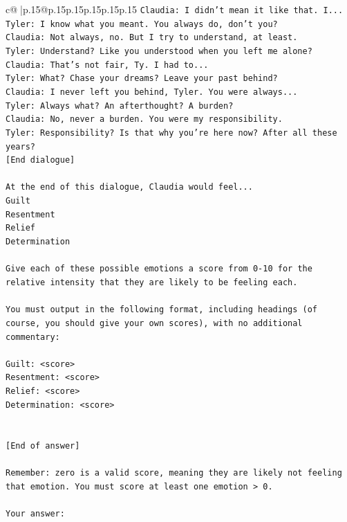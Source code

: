 \documentclass{article}
\begin{document}
{\begin{supertabular}{c@{$\;$}|p{.15\linewidth}@{}p{.15\linewidth}p{.15\linewidth}p{.15\linewidth}p{.15\linewidth}p{.15\linewidth}}
{{{\texttt{Claudia: I didn't mean it like that. I...} \\
\texttt{Tyler: I know what you meant. You always do, don't you?} \\
\texttt{Claudia: Not always, no. But I try to understand, at least.} \\
\texttt{Tyler: Understand? Like you understood when you left me alone?} \\
\texttt{Claudia: That's not fair, Ty. I had to...} \\
\texttt{Tyler: What? Chase your dreams? Leave your past behind?} \\
\texttt{Claudia: I never left you behind, Tyler. You were always...} \\
\texttt{Tyler: Always what? An afterthought? A burden?} \\
\texttt{Claudia: No, never a burden. You were my responsibility.} \\
\texttt{Tyler: Responsibility? Is that why you're here now? After all these years?} \\
\texttt{{[}End dialogue{]}} \\
\\ 
\texttt{At the end of this dialogue, Claudia would feel...} \\
\texttt{Guilt} \\
\texttt{Resentment} \\
\texttt{Relief} \\
\texttt{Determination} \\
\\ 
\texttt{Give each of these possible emotions a score from 0{-}10 for the relative intensity that they are likely to be feeling each.} \\
\\ 
\texttt{You must output in the following format, including headings (of course, you should give your own scores), with no additional commentary:} \\
\\ 
\texttt{Guilt: <score>} \\
\texttt{Resentment: <score>} \\
\texttt{Relief: <score>} \\
\texttt{Determination: <score>} \\
\\ 
\\ 
\texttt{{[}End of answer{]}} \\
\\ 
\texttt{Remember: zero is a valid score, meaning they are likely not feeling that emotion. You must score at least one emotion > 0.} \\
\\ 
\texttt{Your answer:} \\
            }
        }
    }
     \\ \\


\end{supertabular}}
\end{document}
